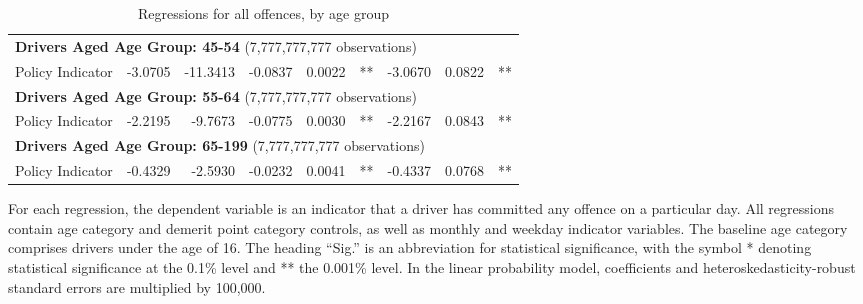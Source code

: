 \begin{table}
\begin{tabular}{l r r r r l r r l}
\hline 

\multicolumn{8}{l}{\textbf{Drivers Aged Age Group: 45-54} (7,777,777,777 observations)} \\ 

Policy Indicator        &  -3.0705        &  -11.3413       &  -0.0837        &  0.0022       &   **       &  -3.0670        &  0.0822       &   **       \\ 

\hline 

\multicolumn{8}{l}{\textbf{Drivers Aged Age Group: 55-64} (7,777,777,777 observations)} \\ 

Policy Indicator        &  -2.2195        &  -9.7673       &  -0.0775        &  0.0030       &   **       &  -2.2167        &  0.0843       &   **       \\ 

\hline 

\multicolumn{8}{l}{\textbf{Drivers Aged Age Group: 65-199} (7,777,777,777 observations)} \\ 

Policy Indicator        &  -0.4329        &  -2.5930       &  -0.0232        &  0.0041       &   **       &  -0.4337        &  0.0768       &   **       \\ 

\hline 

\end{tabular} 
\caption{Regressions for all offences, by age group} 
For each regression, the dependent variable is an indicator that a driver has committed  
any offence on a particular day.  
All regressions contain age category and demerit point category controls, 
as well as monthly and weekday indicator variables. 
The baseline age category comprises drivers under the age of 16. 
The heading ``Sig.'' is an abbreviation for statistical significance, with 
the symbol * denoting statistical significance at the 0.1\% level 
and ** the 0.001\% level. 
In the linear probability model, coefficients and heteroskedasticity-robust standard errors are  
multiplied by 100,000.  
\label{tab:seas_Logit_vs_LPMx100K_regs_by_age} 
\end{table} 
 
